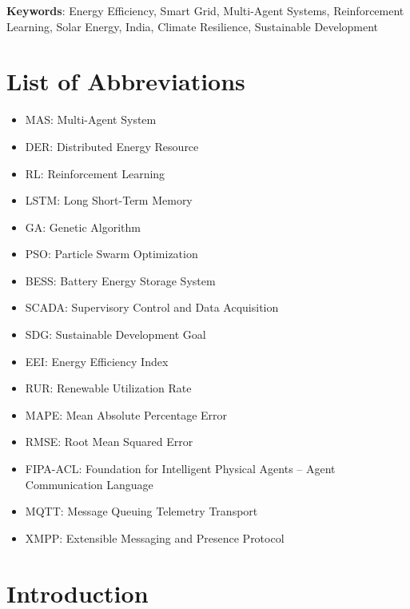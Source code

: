 \documentclass[12pt, a4paper, oneside]{book}
\begin{document}
\textbf{Keywords}: Energy Efficiency, Smart Grid, Multi-Agent Systems, Reinforcement Learning, Solar Energy, India, Climate Resilience, Sustainable Development

\tableofcontents

\listoffigures
{}

\listoftables
{}

\chapter*{List of Abbreviations}
\begin{itemize}
    \item MAS: Multi-Agent System
    \item DER: Distributed Energy Resource
    \item RL: Reinforcement Learning
    \item LSTM: Long Short-Term Memory
    \item GA: Genetic Algorithm
    \item PSO: Particle Swarm Optimization
    \item BESS: Battery Energy Storage System
    \item SCADA: Supervisory Control and Data Acquisition
    \item SDG: Sustainable Development Goal
    \item EEI: Energy Efficiency Index
    \item RUR: Renewable Utilization Rate
    \item MAPE: Mean Absolute Percentage Error
    \item RMSE: Root Mean Squared Error
    \item FIPA-ACL: Foundation for Intelligent Physical Agents – Agent Communication Language
    \item MQTT: Message Queuing Telemetry Transport
    \item XMPP: Extensible Messaging and Presence Protocol
\end{itemize}

\chapter{Introduction}
\end{document}
